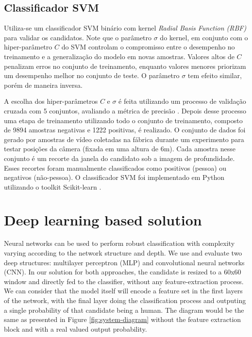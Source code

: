     \subsection{Classificador SVM}
      Utiliza-se um classificador SVM binário com kernel \textit{Radial Basis Function (RBF)} \cite{rbfkernel} para validar os candidatos. Note que o parâmetro $\sigma$ do kernel, em conjunto com o hiper-parâmetro $C$ do SVM controlam o compromisso entre o desempenho no treinamento e a generalização do modelo em novas amostras. Valores altos de $C$ penalizam erros no conjunto de treinamento, enquanto valores menores priorizam um desempenho melhor no conjunto de teste. O parâmetro $\sigma$ tem efeito similar, porém de maneira inversa.

      A escolha dos hiper-parâmetros $C$ e $\sigma$ é feita utilizando um processo de validação cruzada com 5 conjuntos, avaliando a métrica de precisão \cite{evaluationMetrics}. Depois desse processo uma etapa de treinamento utilizando todo o conjunto de treinamento, composto de 9894 amostras negativas e 1222 positivas, é realizado. O conjunto de dados foi gerado por amostras de vídeo coletadas na fábrica durante um experimento para testar posições da câmera (fixada em uma altura de 6m). Cada amostra nesse conjunto é um recorte da janela do candidato sob a imagem de profundidade. Esses recortes foram manualmente classificados como positivos (pessoa) ou negativos (não-pessoa). O classificador SVM foi implementado em Python utilizando o toolkit Scikit-learn \cite{scikit-learn}.


\section{Deep learning based solution}
\label{sec:deep}

    Neural networks can be used to perform robust classification with complexity varying according to the network structure and depth. We use and evaluate two deep structures: multilayer perceptron (MLP) and convolutional neural networks (CNN). In our solution for both approaches, the candidate is resized to a 60x60 window and directly fed to the classifier, without any feature-extraction process. We can consider that the model itself will encode a feature set in the first layers of the network, with the final layer doing the classification process and outputing a single probability of that candidate being a human. The diagram would be the same as presented in Figure \ref{fig:system-diagram} without the feature extraction block and with a real valued output probability.

